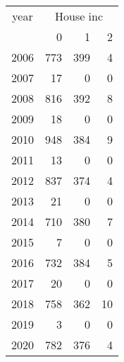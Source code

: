 \footnotesize\begin{tabular}[t]{lrrr}
\toprule
\multicolumn{1}{c}{year} & \multicolumn{3}{c}{House inc} \\
\cmidrule(l{3pt}r{3pt}){1-1} \cmidrule(l{3pt}r{3pt}){2-4}
  & 0 & 1 & 2\\
\midrule
2006 & 773 & 399 & 4\\
2007 & 17 & 0 & 0\\
2008 & 816 & 392 & 8\\
2009 & 18 & 0 & 0\\
2010 & 948 & 384 & 9\\
2011 & 13 & 0 & 0\\
2012 & 837 & 374 & 4\\
2013 & 21 & 0 & 0\\
2014 & 710 & 380 & 7\\
2015 & 7 & 0 & 0\\
2016 & 732 & 384 & 5\\
2017 & 20 & 0 & 0\\
2018 & 758 & 362 & 10\\
2019 & 3 & 0 & 0\\
2020 & 782 & 376 & 4\\
\bottomrule
\end{tabular}
